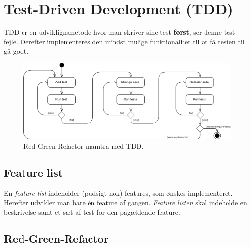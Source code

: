 \section{Test-Driven Development (TDD)}

TDD er en udviklignsmetode hvor man skriver sine test \textbf{først}, ser denne test fejle. Derefter implementeres den mindst mulige funktionalitet til at få testen til gå godt.

\begin{figure}[h]
\centering
\includegraphics[width=\linewidth]{figs/tdd}
\caption{Red-Green-Refactor mamtra med TDD.}
\label{fig:tdd}
\end{figure}

\subsection{Feature list}
En \textit{feature list} indeholder (pudsigt nok) features, som ønskes implementeret. Herefter udvikler man bare én feature af gangen. \textit{Feature listen} skal indeholde en beskrivelse samt et sæt af test for den pågældende feature.

\subsection{Red-Green-Refactor}
\derp